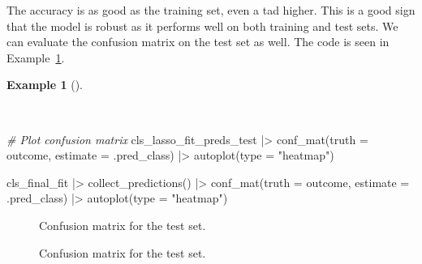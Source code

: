 \documentclass[
  letterpaper,
  DIV=11,
  numbers=noendperiod]{scrreprt}
\newenvironment{Shaded}{\begin{snugshade}}{\end{snugshade}}
\newcommand{\AttributeTok}[1]{\textcolor[rgb]{0.00,0.00,0.00}{#1}}
\newcommand{\CommentTok}[1]{\textcolor[rgb]{0.00,0.00,0.00}{\textit{#1}}}
\newcommand{\FunctionTok}[1]{\textcolor[rgb]{0.00,0.00,0.00}{#1}}
\newcommand{\NormalTok}[1]{\textcolor[rgb]{0.00,0.00,0.00}{#1}}
\newcommand{\SpecialCharTok}[1]{\textcolor[rgb]{0.00,0.00,0.00}{#1}}
\newcommand{\StringTok}[1]{\textcolor[rgb]{0.00,0.00,0.00}{#1}}
\theoremstyle{definition}
\newtheorem{example}{Example}[chapter]
\theoremstyle{remark}
\begin{document}
The accuracy is as good as the training set, even a tad higher. This is
a good sign that the model is robust as it performs well on both
training and test sets. We can evaluate the confusion matrix on the test
set as well. The code is seen in
Example~\ref{exm-pda-class-tune-hyperparameters-evaluate-test-confusion}.

\begin{example}[]\protect\hypertarget{exm-pda-class-tune-hyperparameters-evaluate-test-confusion}{}\label{exm-pda-class-tune-hyperparameters-evaluate-test-confusion}

~

\begin{Shaded}
\begin{Highlighting}[]
\CommentTok{\# Plot confusion matrix}
\NormalTok{cls\_lasso\_fit\_preds\_test }\SpecialCharTok{|\textgreater{}}
  \FunctionTok{conf\_mat}\NormalTok{(}\AttributeTok{truth =}\NormalTok{ outcome, }\AttributeTok{estimate =}\NormalTok{ .pred\_class) }\SpecialCharTok{|\textgreater{}}
  \FunctionTok{autoplot}\NormalTok{(}\AttributeTok{type =} \StringTok{"heatmap"}\NormalTok{)}

\NormalTok{cls\_final\_fit }\SpecialCharTok{|\textgreater{}}
  \FunctionTok{collect\_predictions}\NormalTok{() }\SpecialCharTok{|\textgreater{}}
  \FunctionTok{conf\_mat}\NormalTok{(}\AttributeTok{truth =}\NormalTok{ outcome, }\AttributeTok{estimate =}\NormalTok{ .pred\_class) }\SpecialCharTok{|\textgreater{}}
  \FunctionTok{autoplot}\NormalTok{(}\AttributeTok{type =} \StringTok{"heatmap"}\NormalTok{)}
\end{Highlighting}
\end{Shaded}

\begin{figure}[H]


\caption{\label{fig-pda-class-tune-hyperparameters-evaluate-test-confusion-1}Confusion
matrix for the test set.}

\end{figure}%

\begin{figure}[H]


\caption{\label{fig-pda-class-tune-hyperparameters-evaluate-test-confusion-2}Confusion
matrix for the test set.}

\end{figure}%

\end{example}
\end{document}
